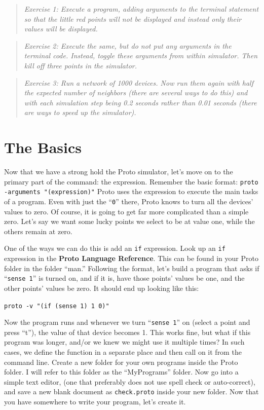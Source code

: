 \documentclass{article}
\newcommand\code[1]{\begin{center}\var{#1}\end{center}}
\newcommand\problem[1]{\begin{quote}{\em #1}\end{quote}}
\newcommand\var[1]{{\tt #1}}
\newcommand\qvar[1]{``{\tt #1}''}
\begin{document}
\problem{Exercise 1: Execute a program, adding arguments to the
  terminal statement so that the little red points will not be
  displayed and instead only their values will be displayed.}

\problem{Exercise 2: Execute the same, but do not put any arguments in
  the terminal code. Instead, toggle these arguments from within
  simulator. Then kill off three points in the simulator.}

\problem{Exercise 3: Run a network of 1000 devices. Now run them again
  with half the expected number of neighbors (there are several ways
  to do this) and with each simulation step being 0.2 seconds rather
  than 0.01 seconds (there are ways to speed up the simulator).}

\section{The Basics}

Now that we have a strong hold the Proto simulator, let's move on to
the primary part of the command: the expression. Remember the basic
format: \var{proto -arguments "(expression)"} Proto uses the
expression to execute the main tasks of a program.  Even with just the
\qvar{0} there, Proto knows to turn all the devices' values to zero.
Of course, it is going to get far more complicated than a simple zero.
Let's say we want some lucky points we select to be at value one,
while the others remain at zero.

One of the ways we can do this is add an \var{if} expression.  Look up
an \var{if} expression in the {\bf Proto Language Reference}.  This
can be found in your Proto folder in the folder ``man.''  Following
the format, let's build a program that asks if \qvar{sense 1} is
turned on, and if it is, have those points' values be one, and the
other points' values be zero.  It should end up looking like this:

\code{proto -v "(if (sense 1) 1 0)"}

Now the program runs and whenever we turn \qvar{sense 1} on (select a
point and press ``t''), the value of that device becomes 1.  This
works fine, but what if this program was longer, and/or we knew we
might use it multiple times?  In such cases, we define the function in
a separate place and then call on it from the command line.  Create a
new folder for your own programs inside the Proto folder.  I will
refer to this folder as the ``MyPrograms'' folder.  Now go into a
simple text editor, (one that preferably does not use spell check or
auto-correct), and save a new blank document as \var{check.proto}
inside your new folder.  Now that you have somewhere to write your
program, let's create it.
\end{document}
